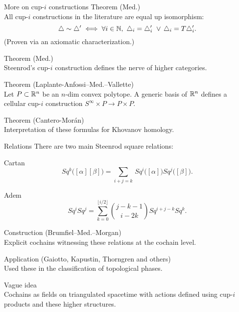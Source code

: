 \begin{frame}{More on cup-$i$ constructions}
	\pause
	\textcolor{pblue}{Theorem (Med.)} \\
	All cup-$i$ constructions in the literature are equal up isomorphism:
	\[
	\triangle \sim \triangle^\prime \iff \forall i \in \mathbb{N}, \ \triangle_i = \triangle_i^\prime \ \vee \, \triangle_i = T \triangle_i^\prime.
	\]
	(Proven via an axiomatic characterization.)

	\bigskip\pause
	\textcolor{pblue}{Theorem (Med.)} \\
	Steenrod's cup-$i$ construction defines the nerve of higher categories.

	\bigskip\pause
	\textcolor{pblue}{Theorem (Laplante-Anfossi--Med.--Vallette)} \\
	Let $P \subset \mathbb{R}^n$ be an $n$-dim convex polytope.
	A generic basis of $\mathbb{R}^n$ defines a cellular cup-$i$ construction $S^\infty \times P \to P \times P$.

	\bigskip\pause
	\textcolor{pblue}{Theorem (Cantero-Mor\'an)} \\
	Interpretation of these formulas for Khovanov homology.
\end{frame}

\begin{frame}{Relations}
	\pause
	There are two main Steenrod square relations:

	\bigskip\pause
	\textcolor{pblue}{Cartan}
	\vspace*{-5pt}
	\begin{equation*}
		Sq^k \big( [\alpha] [\beta] \big) =
		\sum_{i+j=k} \, Sq^i\big([\alpha]\big) Sq^j\big([\beta]\big).
	\end{equation*}

	\pause
	\textcolor{pblue}{Adem}
	\vspace*{-5pt}
	\begin{equation*}
		Sq^i Sq^j =
		\sum_{k=0}^{\lfloor i/2 \rfloor} \binom{j-k-1}{i-2k} Sq^{i+j-k} Sq^k.
	\end{equation*}

	\medskip\pause
	\textcolor{pblue}{Construction (Brumfiel--Med.--Morgan)} \\
	Explicit cochains witnessing these relations at the cochain level.

	\medskip\pause
	\textcolor{pblue}{Application (Gaiotto, Kapustin, Thorngren and others)} \\
	Used these in the classification of topological phases.

	\medskip\pause
	\textcolor{pblue}{Vague idea} \\
	Cochains as fields on triangulated spacetime with actions defined using cup-$i$ products and these higher structures.
\end{frame}